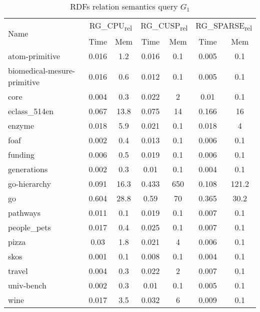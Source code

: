 {\setlength{\tabcolsep}{0.4em}
\begin{table*}[h]
\caption{RDFs relation semantics query $G_1$}
\label{tbl:tableRDFRelationalPathIndexQ1}
\begin{tabular}{| l | c  c | c  c | c  c |}
    \hline
    \multirow{2}{*}{Name}	&	\multicolumn{2}{|c|}{RG\_CPU\textsubscript{rel}}	&	\multicolumn{2}{|c|}{RG\_CUSP\textsubscript{rel}}	&	\multicolumn{2}{|c|}{RG\_SPARSE\textsubscript{rel}}	 \\
    		& Time & Mem &  Time     & Mem & Time     & Mem  \\    
    \hline
    \hline
    atom-primitive              & 0.016 & 1.2  & 0.016 & 0.1 & 0.005 & 0.1 \\
biomedical-mesure-primitive & 0.016 & 0.6  & 0.012 & 0.1 & 0.005 & 0.1     \\
core                        & 0.004 & 0.3  & 0.022 & 2   & 0.01  & 0.1     \\
eclass\_514en                 & 0.067 & 13.8 & 0.075 & 14  & 0.166 & 16    \\
enzyme                      & 0.018 & 5.9  & 0.021 & 0.1 & 0.018 & 4       \\
foaf                        & 0.002 & 0.4  & 0.013 & 0.1 & 0.006 & 0.1     \\
funding                     & 0.006 & 0.5  & 0.019 & 0.1 & 0.006 & 0.1     \\
generations                 & 0.002 & 0.3  & 0.01  & 0.1 & 0.004 & 0.1     \\
go-hierarchy                & 0.091 & 16.3 & 0.433 & 650 & 0.108 & 121.2   \\
go                          & 0.604 & 28.8 & 0.59  & 70  & 0.365 & 30.2    \\
pathways                    & 0.011 & 0.1  & 0.019 & 0.1 & 0.007 & 0.1     \\
people\_pets                & 0.017 & 0.4  & 0.025 & 0.1 & 0.007 & 0.1     \\
pizza                       & 0.03  & 1.8  & 0.021 & 4   & 0.006 & 0.1     \\
skos                        & 0.001 & 0.1  & 0.008 & 0.1 & 0.004 & 0.1     \\
travel                      & 0.004 & 0.3  & 0.022 & 2   & 0.007 & 0.1     \\
univ-bench                  & 0.002 & 0.3  & 0.01  & 0.1 & 0.005 & 0.1     \\
wine                        & 0.017 & 3.5  & 0.032 & 6   & 0.009 & 0.1     \\
    \hline
  \end{tabular}
\end{table*}
}

